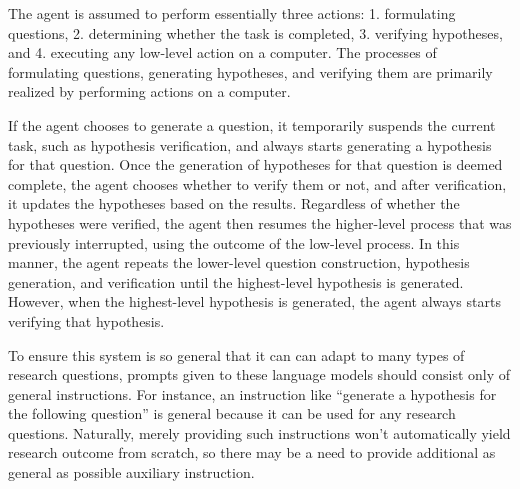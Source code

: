 The agent is assumed to perform essentially three actions: 1. formulating questions, 2. determining whether the task is completed, 3. verifying hypotheses, and 4. executing any low-level action on a computer. The processes of formulating questions, generating hypotheses, and verifying them are primarily realized by performing actions on a computer.

If the agent chooses to generate a question, it temporarily suspends the current task, such as hypothesis verification, and always starts generating a hypothesis for that question. Once the generation of hypotheses for that question is deemed complete, the agent chooses whether to verify them or not, and after verification, it updates the hypotheses based on the results. Regardless of whether the hypotheses were verified, the agent then resumes the higher-level process that was previously interrupted, using the outcome of the low-level process. In this manner, the agent repeats the lower-level question construction, hypothesis generation, and verification until the highest-level hypothesis is generated. However, when the highest-level hypothesis is generated, the agent always starts verifying that hypothesis.

To ensure this system is so general that it can can adapt to many types of research questions, prompts given to these language models should consist only of general instructions. For instance, an instruction like ``generate a hypothesis for the following question'' is general because it can be used for any research questions. Naturally, merely providing such instructions won't automatically yield research outcome from scratch, so there may be a need to provide additional as general as possible auxiliary instruction. 

